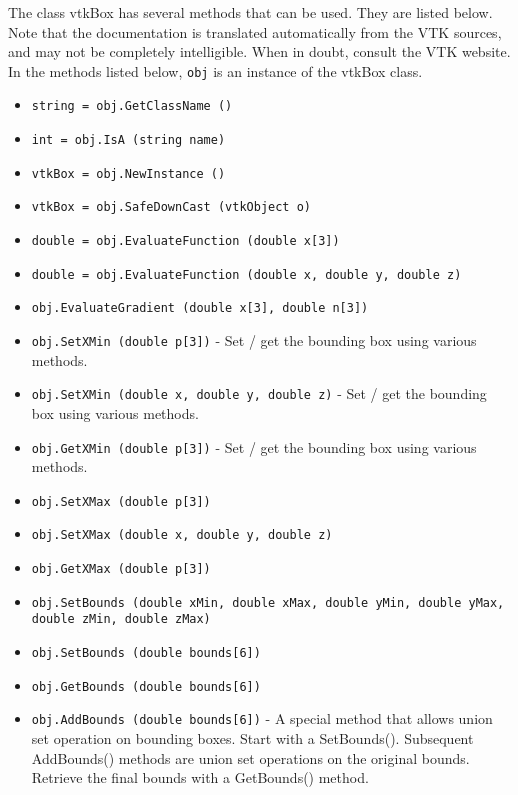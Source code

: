 The class vtkBox has several methods that can be used.
  They are listed below.
Note that the documentation is translated automatically from the VTK sources,
and may not be completely intelligible.  When in doubt, consult the VTK website.
In the methods listed below, \verb|obj| is an instance of the vtkBox class.
\begin{itemize}
\item  \verb|string = obj.GetClassName ()|

\item  \verb|int = obj.IsA (string name)|

\item  \verb|vtkBox = obj.NewInstance ()|

\item  \verb|vtkBox = obj.SafeDownCast (vtkObject o)|

\item  \verb|double = obj.EvaluateFunction (double x[3])|

\item  \verb|double = obj.EvaluateFunction (double x, double y, double z)|

\item  \verb|obj.EvaluateGradient (double x[3], double n[3])|

\item  \verb|obj.SetXMin (double p[3])| -  Set / get the bounding box using various methods.

\item  \verb|obj.SetXMin (double x, double y, double z)| -  Set / get the bounding box using various methods.

\item  \verb|obj.GetXMin (double p[3])| -  Set / get the bounding box using various methods.

\item  \verb|obj.SetXMax (double p[3])|

\item  \verb|obj.SetXMax (double x, double y, double z)|

\item  \verb|obj.GetXMax (double p[3])|

\item  \verb|obj.SetBounds (double xMin, double xMax, double yMin, double yMax, double zMin, double zMax)|

\item  \verb|obj.SetBounds (double bounds[6])|

\item  \verb|obj.GetBounds (double bounds[6])|

\item  \verb|obj.AddBounds (double bounds[6])| -  A special method that allows union set operation on bounding boxes.
 Start with a SetBounds(). Subsequent AddBounds() methods are union set
 operations on the original bounds. Retrieve the final bounds with a 
 GetBounds() method.

\end{itemize}
